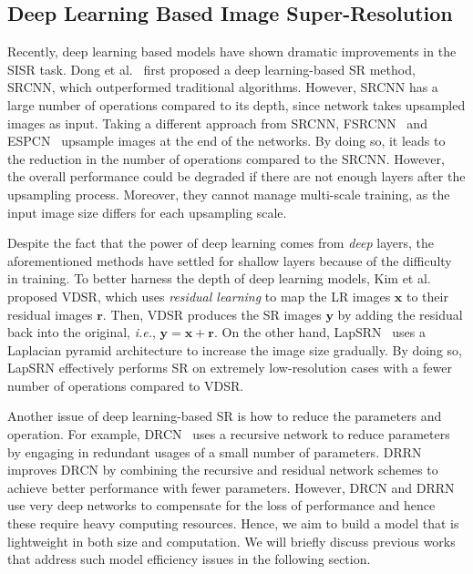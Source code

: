 \documentclass[runningheads]{llncs}
\begin{document}
\subsection{Deep Learning Based Image Super-Resolution}
\label{subsec:sisr}
Recently, deep learning based models have shown dramatic improvements in the SISR task. Dong et al.~\cite{srcnn2014} first proposed a deep learning-based SR method, SRCNN, which outperformed traditional algorithms. However, SRCNN has a large number of operations compared to its depth, since network takes upsampled images as input. Taking a different approach from SRCNN, FSRCNN~\cite{fsrcnn2016} and ESPCN~\cite{espcn2016} upsample images at the end of the networks. By doing so, it leads to the reduction in the number of operations compared to the SRCNN. However, the overall performance could be degraded if there are not enough layers after the upsampling process. Moreover, they cannot manage multi-scale training, as the input image size differs for each upsampling scale.

Despite the fact that the power of deep learning comes from \textit{deep} layers, the aforementioned methods have settled for shallow layers because of the difficulty in training. To better harness the depth of deep learning models, Kim et al.~\cite{vdsr2016} proposed VDSR, which uses \textit{residual learning} to map the LR images $\textbf{x}$ to their residual images $\textbf{r}$. Then, VDSR produces the SR images $\textbf{y}$ by adding the residual back into the original, \textit{i.e.}, $\mathbf{y = x + r}$. On the other hand, LapSRN~\cite{lapsrn2017} uses a Laplacian pyramid architecture to increase the image size gradually. By doing so, LapSRN effectively performs SR on extremely low-resolution cases with a fewer number of operations compared to VDSR.

Another issue of deep learning-based SR is how to reduce the parameters and operation. For example, DRCN~\cite{drcn2016} uses a recursive network to reduce parameters by engaging in redundant usages of a small number of parameters. DRRN~\cite{drnn2017} improves  DRCN by combining the recursive and residual network schemes to achieve better performance with fewer parameters. However, DRCN and DRRN use very deep networks to compensate for the loss of performance and hence these require heavy computing resources. Hence, we aim to build a model that is lightweight in both size and computation. We will briefly discuss previous works that address such model efficiency issues in the following section.
\end{document}
